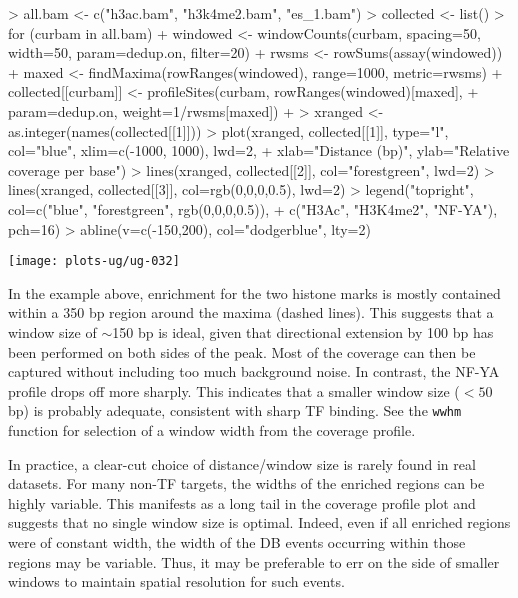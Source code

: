 \documentclass[12pt]{report}
\renewenvironment{Schunk}{\vspace{0pt}}{\vspace{0pt}}
\newcommand{\code}[1]{{\small\texttt{#1}}}
\begin{document}
\begin{Schunk}
\begin{Sinput}
> all.bam <- c("h3ac.bam", "h3k4me2.bam", "es_1.bam")
> collected <- list()
> for (curbam in all.bam) {
+     windowed <- windowCounts(curbam, spacing=50, width=50, param=dedup.on, filter=20)
+     rwsms <- rowSums(assay(windowed))
+     maxed <- findMaxima(rowRanges(windowed), range=1000, metric=rwsms)
+     collected[[curbam]] <- profileSites(curbam, rowRanges(windowed)[maxed], 
+         param=dedup.on, weight=1/rwsms[maxed])
+ }
> xranged <- as.integer(names(collected[[1]]))
> plot(xranged, collected[[1]], type="l", col="blue", xlim=c(-1000, 1000), lwd=2, 
+     xlab="Distance (bp)", ylab="Relative coverage per base")
> lines(xranged, collected[[2]], col="forestgreen", lwd=2)
> lines(xranged, collected[[3]], col=rgb(0,0,0,0.5), lwd=2)
> legend("topright", col=c("blue", "forestgreen", rgb(0,0,0,0.5)),
+     c("H3Ac", "H3K4me2", "NF-YA"), pch=16)
> abline(v=c(-150,200), col="dodgerblue", lty=2)
\end{Sinput}
\end{Schunk}

\begin{center}
\texttt{[image: plots-ug/ug-032]}
\end{center}

In the example above, enrichment for the two histone marks is mostly contained within a 350 bp region around the maxima (dashed lines).
This suggests that a window size of $\sim$150 bp is ideal, given that directional extension by 100 bp has been performed on both sides of the peak.
Most of the coverage can then be captured without including too much background noise.
In contrast, the NF-YA profile drops off more sharply.
This indicates that a smaller window size ($< 50$ bp) is probably adequate, consistent with sharp TF binding.
See the \code{wwhm} function for selection of a window width from the coverage profile.

In practice, a clear-cut choice of distance/window size is rarely found in real datasets.
For many non-TF targets, the widths of the enriched regions can be highly variable.
This manifests as a long tail in the coverage profile plot and suggests that no single window size is optimal.
Indeed, even if all enriched regions were of constant width, the width of the DB events occurring within those regions may be variable.
Thus, it may be preferable to err on the side of smaller windows to maintain spatial resolution for such events.
\end{document}
